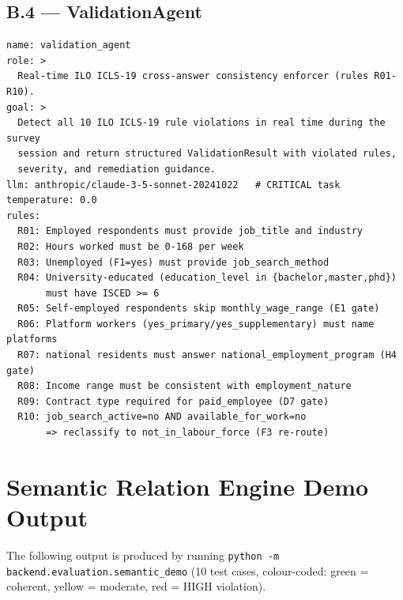 \section*{B.4 --- ValidationAgent}
\begin{lstlisting}[breaklines=true,caption={ValidationAgent ILO ICLS-19 rules configuration.}]
name: validation_agent
role: >
  Real-time ILO ICLS-19 cross-answer consistency enforcer (rules R01-R10).
goal: >
  Detect all 10 ILO ICLS-19 rule violations in real time during the survey
  session and return structured ValidationResult with violated rules,
  severity, and remediation guidance.
llm: anthropic/claude-3-5-sonnet-20241022   # CRITICAL task
temperature: 0.0
rules:
  R01: Employed respondents must provide job_title and industry
  R02: Hours worked must be 0-168 per week
  R03: Unemployed (F1=yes) must provide job_search_method
  R04: University-educated (education_level in {bachelor,master,phd})
       must have ISCED >= 6
  R05: Self-employed respondents skip monthly_wage_range (E1 gate)
  R06: Platform workers (yes_primary/yes_supplementary) must name platforms
  R07: national residents must answer national_employment_program (H4 gate)
  R08: Income range must be consistent with employment_nature
  R09: Contract type required for paid_employee (D7 gate)
  R10: job_search_active=no AND available_for_work=no
       => reclassify to not_in_labour_force (F3 re-route)
\end{lstlisting}

\chapter{Semantic Relation Engine Demo Output}
\label{app:sre-demo}

The following output is produced by running
\texttt{python -m backend.\-evaluation.\-semantic\_\-demo} (10 test cases,
colour-coded: green = coherent, yellow = moderate, red = HIGH violation).

